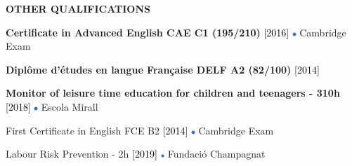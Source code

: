 \documentclass[../main.tex]{subfiles}
\begin{document}
    \vspace*{0.5cm}
    \textbf{\textcolor{myCV2}{OTHER QUALIFICATIONS\underline{\hspace{4.5cm}}}}
        \vspace*{0.3cm}
        
        \textbf{Certificate in Advanced English CAE C1 (195/210)}
        \textcolor{black}{[2016]}
        \includegraphics[width=0.15cm]{assets/full.png} 
        Cambridge Exam
        
        \vspace*{0.25cm}
        \textbf{Diplôme d'études en langue Française DELF A2 (82/100)} 
        \textcolor{black}{[2014]}
        
        \vspace*{0.25cm}
        \textbf{Monitor of leisure time education for children and teenagers - 310h}
        \textcolor{black}{[2018]}
        \includegraphics[width=0.15cm]{assets/full.png} 
        Escola Mirall
        
        \vspace*{0.25cm}
        First Certificate in English FCE B2
        \textcolor{black}{[2014]}
        \includegraphics[width=0.15cm]{assets/full.png} 
        Cambridge Exam 

        \vspace*{0.25cm}
        Labour Risk Prevention - 2h
        \textcolor{black}{[2019]}
        \includegraphics[width=0.15cm]{assets/full.png}
        Fundació Champagnat

\end{document}
